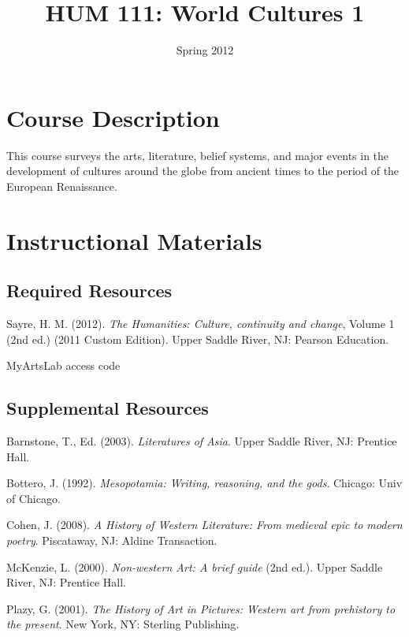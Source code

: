 \documentclass{article}
\title{HUM 111: World Cultures 1}
\date{Spring 2012}
\begin{document}
\maketitle


\section*{Course Description}
This course surveys the arts, literature, belief systems, and major events in the development of cultures around the globe from ancient times to the period of the European Renaissance.

\section*{Instructional Materials}
\subsection*{Required Resources}
\begin{itemize*}
	\item Sayre, H. M. (2012). \emph{The Humanities: Culture, continuity and change}, Volume 1 (2nd ed.) (2011 Custom Edition). Upper Saddle River, NJ: Pearson Education.
	\item MyArtsLab access code
\end{itemize*}

\subsection*{Supplemental Resources}
\begin{itemize*}
	\item Barnstone, T., Ed. (2003). \emph{Literatures of Asia}. Upper Saddle River, NJ: Prentice Hall.
	\item Bottero, J. (1992). \emph{Mesopotamia: Writing, reasoning, and the gods}. Chicago: Univ of Chicago.
	\item Cohen, J. (2008). \emph{A History of Western Literature: From medieval epic to modern poetry}. Piscataway, NJ: Aldine Transaction.
	\item McKenzie, L. (2000). \emph{Non-western Art: A brief guide} (2nd ed.). Upper Saddle River, NJ: Prentice Hall.
	\item Plazy, G. (2001). \emph{The History of Art in Pictures: Western art from prehistory to the present}. New York, NY: Sterling Publishing.
\end{itemize*}
\end{document}

